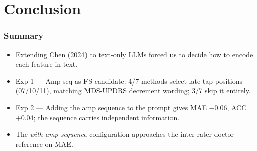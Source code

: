 \documentclass[aspectratio=169]{beamer}
\begin{document}
\section{Conclusion}

\begin{frame}
    \frametitle{Summary}
    \begin{itemize}
        \item Extending Chen (2024) to text-only LLMs forced
              us to decide how to encode each feature in text.
        \item Exp 1 --- Amp seq as FS candidate: 4/7 methods
              select late-tap positions (07/10/11), matching
              MDS-UPDRS decrement wording; 3/7 skip it entirely.
        \item Exp 2 --- Adding the amp sequence to the prompt
              gives MAE $-0.06$, ACC $+0.04$; the sequence
              carries independent information.
        \item The \emph{with amp sequence} configuration
              approaches the inter-rater doctor reference on
              MAE.
    \end{itemize}
\end{frame}
\end{document}
